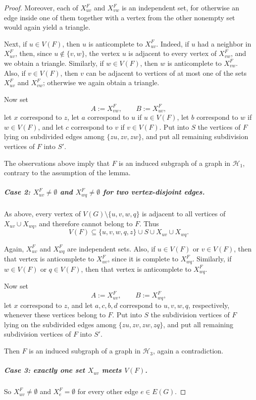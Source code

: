 \documentclass[a4paper,UKenglish,cleveref, autoref, thm-restate]{lipics-v2021}
\newcommand{\cH}{\mathcal{H}}
\begin{document}
\begin{proof}
Moreover, each of $X_{uv}^F$ and $X_{vw}^F$ is an independent set, for otherwise
an edge inside one of them together with a vertex from the other nonempty set would
again yield a triangle.

Next, if $u\in V(F)$, then $u$ is anticomplete to $X_{uv}^F$.
Indeed, if $u$ had a neighbor in $X_{uv}^F$, then, since $u\notin\{v,w\}$,
the vertex $u$ is adjacent to every vertex of $X_{vw}^F$, and we obtain a triangle.
Similarly, if $w\in V(F)$, then $w$ is anticomplete to $X_{vw}^F$.
Also, if $v\in V(F)$, then $v$ can be adjacent to vertices of at most one of the
sets $X_{uv}^F$ and $X_{vw}^F$; otherwise we again obtain a triangle.

Now set
\[
A:=X_{vw}^F,\qquad B:=X_{uv}^F,
\]
let $x$ correspond to $z$, let $a$ correspond to $u$ if $u\in V(F)$, let $b$
correspond to $w$ if $w\in V(F)$, and let $c$ correspond to $v$ if $v\in V(F)$.
Put into $S$ the vertices of $F$ lying on subdivided edges among
$\{zu,zv,zw\}$, and put all remaining subdivision vertices of $F$ into $S'$.

The observations above imply that $F$ is an induced subgraph of a graph in $\cH_1$,
contrary to the assumption of the lemma.

\subparagraph*{Case 2: \boldmath $X_{uv}^F\neq\emptyset$ and $X_{wq}^F\neq\emptyset$ for two
vertex-disjoint edges.}
As above, every vertex of $V(G)\setminus\{u,v,w,q\}$ is adjacent to all vertices of
$X_{uv}\cup X_{wq}$, and therefore cannot belong to $F$.
Thus
\[
V(F)\subseteq \{u,v,w,q,z\}\cup S\cup X_{uv}\cup X_{wq}.
\]

Again, $X_{uv}^F$ and $X_{wq}^F$ are independent sets.
Also, if $u\in V(F)$ or $v\in V(F)$, then that vertex is anticomplete to $X_{uv}^F$,
since it is complete to $X_{wq}^F$.
Similarly, if $w\in V(F)$ or $q\in V(F)$, then that vertex is anticomplete to
$X_{wq}^F$.

Now set
\[
A:=X_{uv}^F,\qquad B:=X_{wq}^F,
\]
let $x$ correspond to $z$, and let $a,c,b,d$ correspond to
$u,v,w,q$, respectively, whenever these vertices belong to $F$.
Put into $S$ the subdivision vertices of $F$ lying on the subdivided edges among
$\{zu,zv,zw,zq\}$, and put all remaining subdivision vertices of $F$ into $S'$.

Then $F$ is an induced subgraph of a graph in $\cH_3$, again a contradiction.

\subparagraph*{Case 3: exactly one set \boldmath $X_{uv}$ meets $V(F)$.}
So $X_{uv}^F\neq\emptyset$ and $X_e^F=\emptyset$ for every other edge $e\in E(G)$.


\end{proof}
\end{document}
